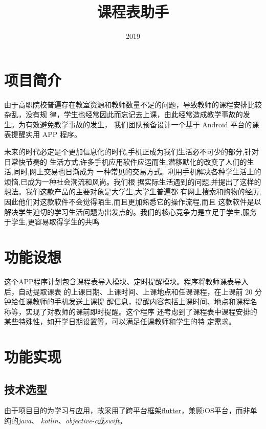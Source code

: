 \documentclass{article}
\begin{document}
\title{ \bf 课程表助手 }
\author{}
\date{2019}
\maketitle

\tableofcontents

\pagebreak

\section{项目简介}

由于高职院校普遍存在教室资源和教师数量不足的问题，导致教师的课程安排比较杂乱，没有规
律，学生也经常因此而忘记去上课，由此经常造成教学事故的发生。为有效避免教学事故的发生，
我们团队预备设计一个基于 Android 平台的课表提醒实用 APP 程序。

未来的时代必定是个更加信息化的时代,手机正成为我们生活必不可少的部分,针对日常快节奏的
生活方式,许多手机应用软件应运而生,潜移默化的改变了人们的生活,同时,网上交易也日渐成为
一种常见的交易方式。利用手机解决各种学生活上的烦恼,已成为一种社会潮流和风尚。我们根
据实际生活遇到的问题,并提出了这样的想法。我们这款产品的主要对象是大学生,大学生普遍都
有网上搜索和购物的经历,因此他们对这款软件不会觉得陌生,而且更加熟悉它的操作流程,而且
这款软件是以解决学生迫切的学习生活问题为出发点的。我们的核心竞争力是立足于学生,服务
于学生,更容易取得学生的共鸣

\section{功能设想}

这个APP程序计划包含课程表导入模块、定时提醒模块。程序将教师课表导入后，自动提取课表
的上课日期、上课时间、上课地点和任课课程，在上课前 20 分钟给任课教师的手机发送上课提
醒信息，提醒内容包括上课时间、地点和课程名称等，实现了对教师的课前即时提醒。这个程序
还考虑到了课程表中课程安排的某些特殊性，如开学日期设置等，可以满足任课教师和学生的特
定需求。

\section{功能实现}

  \subsection{技术选型}

    由于项目目的为学习与应用，故采用了跨平台框架\href{https://flutter.dev/}{flutter}，兼顾iOS平台，而非单纯的\textit{java}、
    \textit{kotlin}、\textit{objective-c}或\textit{swift}。
\end{document}
